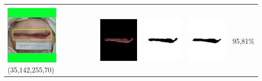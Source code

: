 \begin{table}[H]
\begin{tabular}{|m{1.0in}|m{1.0in}|m{1.0in}|m{1.0in}|m{0.6in}|}
		&  &  & \\
		\includegraphics[width=1.0in]{gambar/hasil_segmentasi/luka_merah/image_35_rect.jpg} {\centering\fontsize{10}{10}\selectfont(35,142,255,70)}&
		\includegraphics[width=1.0in]{gambar/hasil_segmentasi/luka_merah/result_35.jpg}&
		\includegraphics[width=1.0in]{gambar/hasil_segmentasi/luka_merah/mask_r_35.jpg}&
		\includegraphics[width=1.0in]{gambar/hasil_segmentasi/luka_merah/35_r.jpg}&
		95,81\% \\
		\hline


\end{tabular}
\end{table}
